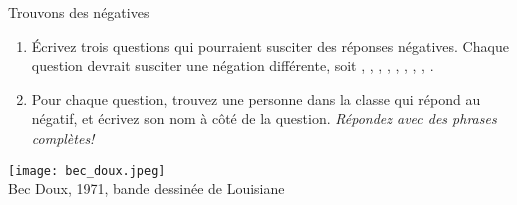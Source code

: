 \begin{frame}{Trouvons des négatives}
  \small
  \begin{enumerate}
    \item Écrivez trois questions qui pourraient susciter  des réponses négatives. Chaque question devrait susciter une négation différente, soit , , , , , , , , .
    \item<2-> Pour chaque question, trouvez une personne dans la classe qui répond au négatif, et écrivez son nom à côté de la question. \emph{Répondez avec des phrases complètes!}
  \end{enumerate}
  \begin{center}
    \footnotesize
    \texttt{[image: bec\_doux.jpeg]} \\
    Bec Doux, 1971, bande dessinée de Louisiane
  \end{center}
\end{frame}